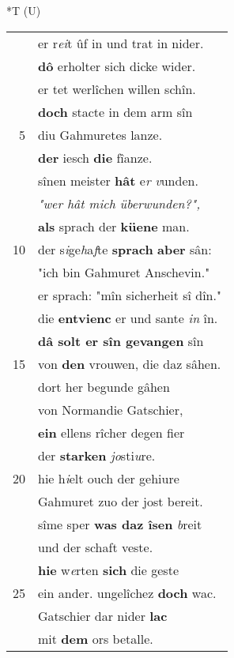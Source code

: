 \documentclass[8pt,a4paper,notitlepage]{article}
\begin{document}
\begin{table}[ht]
\begin{minipage}[t]{0.5\linewidth}
\end{minipage}
\hspace{0.5cm}
\begin{minipage}[t]{0.5\linewidth}
\small
\begin{center}*T (U)
\end{center}
\begin{tabular}{rl}
 & er r\textit{ei}t ûf in und trat in nider.\\ 
 & \textbf{dô} erholter sich dicke wider.\\ 
 & er tet werlîchen willen schîn.\\ 
 & \textbf{doch} stacte in dem arm sîn\\ 
5 & diu Gahmuretes lanze.\\ 
 & \textbf{der} iesch \textbf{die} fîanze.\\ 
 & sînen meister \textbf{hât} e\textit{r v}unden.\\ 
 & \textit{"wer hât mich überwunden?",}\\ 
 & \textbf{als} sprach der \textbf{küene} man.\\ 
10 & der s\textit{i}ge\textit{h}a\textit{f}te \textbf{sprach} \textbf{aber} sân:\\ 
 & "ich bin Gahmuret Anschevin."\\ 
 & er sprach: "mîn sicherheit sî dîn."\\ 
 & die \textbf{entvienc} er und sante \textit{in} în.\\ 
 & \textbf{dâ solt er sîn gevangen} sîn\\ 
15 & von \textbf{den} vrouwen, die daz sâhen.\\ 
 & dort her begunde gâhen\\ 
 & von Normandie Gatschier,\\ 
 & \textbf{ein} ellens rîcher degen fier\\ 
 & der \textbf{starken} \textit{jo}sti\textit{u}re.\\ 
20 & hie h\textit{i}elt ouch der gehiure\\ 
 & Gahmuret zuo der jost bereit.\\ 
 & sîme sper \textbf{was daz îsen} \textit{b}reit\\ 
 & und der schaft veste.\\ 
 & \textbf{hie} w\textit{e}rten \textbf{sich} die geste\\ 
25 & ein ander. ungelîchez \textbf{doch} wac.\\ 
 & Gatschier dar nider \textbf{lac}\\ 
 & mit \textbf{dem} ors betalle.\\ 

\end{tabular}
\end{minipage}
\end{table}
\end{document}
